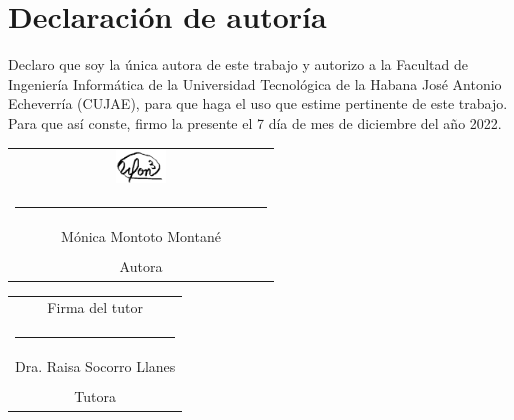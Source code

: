 \chapter*{Declaración de autoría}

Declaro que soy la única autora de este trabajo y autorizo a la Facultad de Ingeniería Informática de la Universidad Tecnológica de la Habana José Antonio Echeverría (CUJAE), para que haga el uso que estime pertinente de este trabajo. Para que así conste, firmo la presente el 7 día de mes de diciembre del año 2022.

\vspace{1.5cm}

\begingroup	

\setlength{\tabcolsep}{10pt} %
\renewcommand{\arraystretch}{0.5} %

\begin{tabular}{c}
	\includegraphics[width=0.2\textwidth]{imagen/firma.png}\\
	\noindent\rule{6cm}{0.4pt} \\
	Mónica Montoto Montané \\
    \\
	Autora
\end{tabular}

\vspace{3cm}

\begin{tabular}{c}
	Firma del tutor  \\
	\noindent\rule{6cm}{0.4pt}\\
	Dra. Raisa Socorro Llanes \\
	\\
	Tutora 
\end{tabular}
\endgroup

